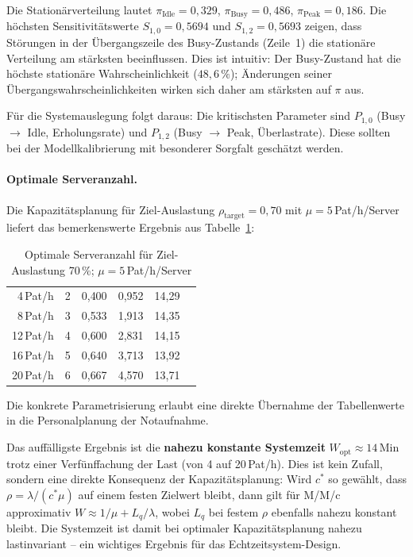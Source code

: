 ﻿\documentclass[a4paper,12pt]{report}
\theoremstyle{definition}
\begin{document}
Die Stationärverteilung lautet $\pi_\text{Idle} = 0{,}329$,
$\pi_\text{Busy} = 0{,}486$, $\pi_\text{Peak} = 0{,}186$.
Die höchsten Sensitivitätswerte $S_{1,0} = 0{,}5694$ und
$S_{1,2} = 0{,}5693$ zeigen, dass Störungen in der Übergangszeile
des Busy-Zustands (Zeile~1) die stationäre Verteilung am stärksten
beeinflussen. Dies ist intuitiv: Der Busy-Zustand hat die höchste
stationäre Wahrscheinlichkeit ($48{,}6\,\%$); Änderungen seiner
Übergangswahrscheinlichkeiten wirken sich daher am stärksten auf $\pi$ aus.

Für die Systemauslegung folgt daraus: Die kritischsten Parameter sind
$P_{1,0}$ (Busy $\to$ Idle, Erholungsrate) und $P_{1,2}$
(Busy $\to$ Peak, Überlastrate). Diese sollten bei der Modellkalibrierung
mit besonderer Sorgfalt geschätzt werden.

\paragraph{Optimale Serveranzahl.}
Die Kapazitätsplanung für Ziel-Auslastung $\rho_\text{target} = 0{,}70$
mit $\mu = 5$\,Pat/h/Server liefert das bemerkenswerte Ergebnis aus
Tabelle~\ref{tab:kapazitaet}:

\begin{table}[H]
	\centering
	\begin{tabular}{@{}rrrrrr@{}}
		\toprule
		\boldmath{$\lambda$} & \boldmath{$c^*$} & \boldmath{$\rho_\text{opt}$} &
		\boldmath{$L_\text{opt}$} & \boldmath{$W_\text{opt}$\,(Min)} \\
		\midrule
		4\,Pat/h & 2 & 0{,}400 &  0{,}952 & 14{,}29 \\
		8\,Pat/h & 3 & 0{,}533 &  1{,}913 & 14{,}35 \\
		12\,Pat/h & 4 & 0{,}600 &  2{,}831 & 14{,}15 \\
		16\,Pat/h & 5 & 0{,}640 &  3{,}713 & 13{,}92 \\
		20\,Pat/h & 6 & 0{,}667 &  4{,}570 & 13{,}71 \\
		\bottomrule
	\end{tabular}
	\caption{Optimale Serveranzahl für Ziel-Auslastung 70\,\%; $\mu = 5$\,Pat/h/Server}
\label{tab:optimale-server-mu5}
	\label{tab:kapazitaet}
\end{table}

Die konkrete Parametrisierung erlaubt eine direkte Übernahme der Tabellenwerte in die Personalplanung der Notaufnahme.

Das auffälligste Ergebnis ist die \textbf{nahezu konstante Systemzeit}
$W_\text{opt} \approx 14$\,Min trotz einer Verfünffachung der Last
(von 4 auf 20\,Pat/h). Dies ist kein Zufall, sondern eine direkte
Konsequenz der Kapazitätsplanung: Wird $c^*$ so gewählt, dass
$\rho = \lambda/(c^* \mu)$ auf einem festen Zielwert bleibt, dann
gilt für M/M/c approximativ $W \approx 1/\mu + L_q/\lambda$, wobei
$L_q$ bei festem $\rho$ ebenfalls nahezu konstant bleibt. Die Systemzeit
ist damit bei optimaler Kapazitätsplanung nahezu lastinvariant --
ein wichtiges Ergebnis für das Echtzeitsystem-Design.
\end{document}
